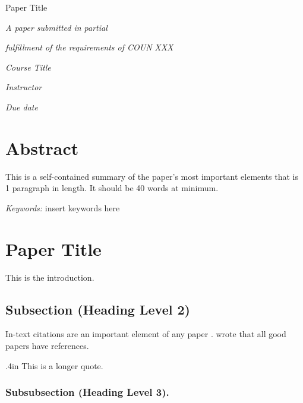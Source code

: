 \documentclass[12pt]{article}
\author{Author}
\title{\papertitle}
\newcommand{\papertitle}{Paper Title}
\newcommand{\coursenumber}{XXX}
\newcommand{\coursetitle}{Course Title}
\newcommand{\instructor}{Instructor}
\newcommand{\duedate}{Due date}
\newcommand{\indentamount}{.4in}
\renewcommand{\maketitle}{
  \begin{center}
    \vspace*{150pt}

    \begin{singlespace}
      \papertitle

      \theauthor
    \end{singlespace}

    \vspace{50pt}

    \textit{A paper submitted in partial}

    \textit{fulfillment of the requirements of COUN}
    \textit{\coursenumber}

    \textit{\coursetitle}

    \textit{\instructor}

    \textit{\duedate}
  \end{center}
}
\newenvironment{longquote}{\begin{adjustwidth}{\indentamount}{}}{\end{adjustwidth}}
\begin{document}

\maketitle

\newpage



\section{Abstract}

\setlength{\parindent}{0pt}

This is a self-contained summary of the paper's most important elements
that is 1 paragraph in length.
It should be 40 words at minimum.
\lipsum[1]

\setlength{\parindent}{\indentamount}

\textit{Keywords:} insert keywords here

\newpage



\section{\papertitle}

This is the introduction. \lipsum[1]

\subsection{Subsection (Heading Level 2)}

In-text citations are an important element of any paper \parencite[42–43]{test_1}.
\textcite{test_2} wrote that all good papers have references.

\begin{longquote}
This is a longer quote. \lipsum[1] \parencite{test_1}
\end{longquote}

\subsubsection{Subsubsection (Heading Level 3).}

\lipsum[1]



\newpage

\printbibliography
\end{document}
